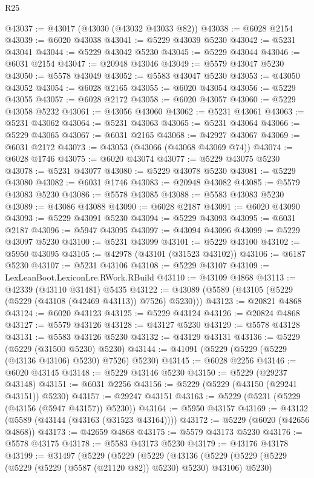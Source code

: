 \begin{lexlean}{R25}
\begin{coremodule}
@43037 := @43017 (@43030 (@43032 @43033 @82))
@43038 := @6028 @2154
@43039 := @6020 @43038
@43041 := @5229 @43039 @5230
@43042 := @5231 @43041
@43044 := @5229 @43042 @5230
@43045 := @5229 @43044
@43046 := @6031 @2154
@43047 := @20948 @43046
@43049 := @5579 @43047 @5230
@43050 := @5578 @43049
@43052 := @5583 @43047 @5230
@43053 := @43050 @43052
@43054 := @6028 @2165
@43055 := @6020 @43054
@43056 := @5229 @43055
@43057 := @6028 @2172
@43058 := @6020 @43057
@43060 := @5229 @43058 @5232
@43061 := @43056 @43060
@43062 := @5231 @43061
@43063 := @5231 @43062
@43064 := @5231 @43063
@43065 := @5231 @43064
@43066 := @5229 @43065
@43067 := @6031 @2165
@43068 := @42927 @43067
@43069 := @6031 @2172
@43073 := @43053 (@43066 (@43068 @43069 @74))
@43074 := @6028 @1746
@43075 := @6020 @43074
@43077 := @5229 @43075 @5230
@43078 := @5231 @43077
@43080 := @5229 @43078 @5230
@43081 := @5229 @43080
@43082 := @6031 @1746
@43083 := @20948 @43082
@43085 := @5579 @43083 @5230
@43086 := @5578 @43085
@43088 := @5583 @43083 @5230
@43089 := @43086 @43088
@43090 := @6028 @2187
@43091 := @6020 @43090
@43093 := @5229 @43091 @5230
@43094 := @5229 @43093
@43095 := @6031 @2187
@43096 := @5947 @43095
@43097 := @43094 @43096
@43099 := @5229 @43097 @5230
@43100 := @5231 @43099
@43101 := @5229 @43100
@43102 := @5950 @43095
@43105 := @42978 (@43101 (@31523 @43102))
@43106 := @6187 @5230
@43107 := @5231 @43106
@43108 := @5229 @43107
@43109 := LexLeanBoot.LexiconLre.RWork.RBuild
@43110 := @43109 @4868
@43113 := @42339 (@43110 @31481) @5435
@43122 := @43089 (@5589 (@43105 (@5229 (@5229 (@43108 (@42469 @43113)) @7526) @5230)))
@43123 := @20821 @4868
@43124 := @6020 @43123
@43125 := @5229 @43124
@43126 := @20824 @4868
@43127 := @5579 @43126
@43128 := @43127 @5230
@43129 := @5578 @43128
@43131 := @5583 @43126 @5230
@43132 := @43129 @43131
@43136 := @5229 (@5229 (@31500 @5230) @5230)
@43144 := @41091 (@5229 (@5229 (@5229 (@43136 @43106) @5230) @7526) @5230)
@43145 := @6028 @2256
@43146 := @6020 @43145
@43148 := @5229 @43146 @5230
@43150 := @5229 (@29237 @43148)
@43151 := @6031 @2256
@43156 := @5229 (@5229 (@43150 (@29241 @43151)) @5230)
@43157 := @29247 @43151
@43163 := @5229 (@5231 (@5229 (@43156 (@5947 @43157)) @5230))
@43164 := @5950 @43157
@43169 := @43132 (@5589 (@43144 (@43163 (@31523 @43164))))
@43172 := @5229 (@6020 (@42656 @4868))
@43173 := @42659 @4868
@43175 := @5579 @43173 @5230
@43176 := @5578 @43175
@43178 := @5583 @43173 @5230
@43179 := @43176 @43178
@43199 := @31497
    (@5229
      (@5229
        (@5229
          (@43136
            (@5229
              (@5229 (@5229 (@5229 (@5229 (@5587 (@21120 @82)) @5230) @5230) @43106) @5230)

\end{coremodule}
\end{lexlean}
